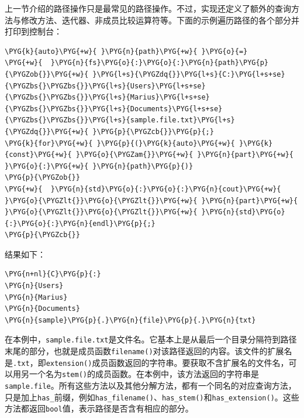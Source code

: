 
上一节介绍的路径操作只是最常见的路径操作。不过，实现还定义了额外的查询方法与修改方法、迭代器、非成员比较运算符等。下面的示例遍历路径的各个部分并打印到控制台：



\begin{codeblockbg}
\begin{Verbatim}[commandchars=\\\{\},breaklines=true,breakanywhere=true,fontsize=\codefont,xleftmargin=17bp]
\PYG{k}{auto}\PYG{+w}{ }\PYG{n}{path}\PYG{+w}{ }\PYG{o}{=}
\PYG{+w}{  }\PYG{n}{fs}\PYG{o}{:}\PYG{o}{:}\PYG{n}{path}\PYG{p}{\PYGZob{}}\PYG{+w}{ }\PYG{l+s}{\PYGZdq{}}\PYG{l+s}{C:}\PYG{l+s+se}{\PYGZbs{}\PYGZbs{}}\PYG{l+s}{Users}\PYG{l+s+se}{\PYGZbs{}\PYGZbs{}}\PYG{l+s}{Marius}\PYG{l+s+se}{\PYGZbs{}\PYGZbs{}}\PYG{l+s}{Documents}\PYG{l+s+se}{\PYGZbs{}\PYGZbs{}}\PYG{l+s}{sample.file.txt}\PYG{l+s}{\PYGZdq{}}\PYG{+w}{ }\PYG{p}{\PYGZcb{}}\PYG{p}{;}
\PYG{k}{for}\PYG{+w}{ }\PYG{p}{(}\PYG{k}{auto}\PYG{+w}{ }\PYG{k}{const}\PYG{+w}{ }\PYG{o}{\PYGZam{}}\PYG{+w}{ }\PYG{n}{part}\PYG{+w}{ }\PYG{o}{:}\PYG{+w}{ }\PYG{n}{path}\PYG{p}{)}
\PYG{p}{\PYGZob{}}
\PYG{+w}{  }\PYG{n}{std}\PYG{o}{:}\PYG{o}{:}\PYG{n}{cout}\PYG{+w}{ }\PYG{o}{\PYGZlt{}}\PYG{o}{\PYGZlt{}}\PYG{+w}{ }\PYG{n}{part}\PYG{+w}{ }\PYG{o}{\PYGZlt{}}\PYG{o}{\PYGZlt{}}\PYG{+w}{ }\PYG{n}{std}\PYG{o}{:}\PYG{o}{:}\PYG{n}{endl}\PYG{p}{;}
\PYG{p}{\PYGZcb{}}
\end{Verbatim}
\end{codeblockbg}



结果如下：



\begin{codeblockbg}
\begin{Verbatim}[commandchars=\\\{\},breaklines=true,breakanywhere=true,fontsize=\codefont,xleftmargin=17bp]
\PYG{n+nl}{C}\PYG{p}{:}
\PYG{n}{Users}
\PYG{n}{Marius}
\PYG{n}{Documents}
\PYG{n}{sample}\PYG{p}{.}\PYG{n}{file}\PYG{p}{.}\PYG{n}{txt}
\end{Verbatim}
\end{codeblockbg}



在本例中，\texttt{sample.\allowbreak{}file.\allowbreak{}txt}是文件名。它基本上是从最后一个目录分隔符到路径末尾的部分，也就是成员函数\texttt{filename()}对该路径返回的内容。该文件的扩展名是\texttt{.\allowbreak{}txt}，即\texttt{extension()}成员函数返回的字符串。要获取不含扩展名的文件名，可以用另一个名为\texttt{stem()}的成员函数。在本例中，该方法返回的字符串是\texttt{sample.\allowbreak{}file}。所有这些方法以及其他分解方法，都有一个同名的对应查询方法，只是加上\texttt{has\_}前缀，例如\texttt{has\_\allowbreak{}filename()}、\texttt{has\_\allowbreak{}stem()}和\texttt{has\_\allowbreak{}extension()}。这些方法都返回\texttt{bool}值，表示路径是否含有相应的部分。


